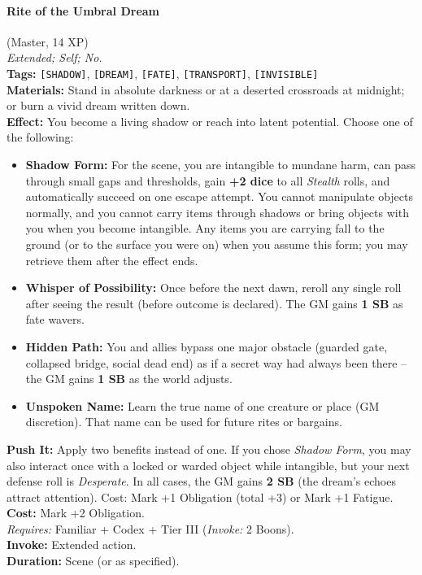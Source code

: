 \paragraph{Rite of the Umbral Dream} (Master, 14 XP) \hfill \\
\emph{Extended; Self; No.} \\
\textbf{Tags:} \texttt{[SHADOW]}, \texttt{[DREAM]}, \texttt{[FATE]}, \texttt{[TRANSPORT]}, \texttt{[INVISIBLE]} \\
\textbf{Materials:} Stand in absolute darkness or at a deserted crossroads at midnight; or burn a vivid dream written down. \\
\textbf{Effect:} You become a living shadow or reach into latent potential. Choose one of the following:
\begin{itemize}
  \item \textbf{Shadow Form:} For the scene, you are intangible to mundane harm, can pass through small gaps and thresholds, gain \textbf{+2 dice} to all \textit{Stealth} rolls, and automatically succeed on one escape attempt. You cannot manipulate objects normally, and you cannot carry items through shadows or bring objects with you when you become intangible. Any items you are carrying fall to the ground (or to the surface you were on) when you assume this form; you may retrieve them after the effect ends.
  \item \textbf{Whisper of Possibility:} Once before the next dawn, reroll any single roll after seeing the result (before outcome is declared). The GM gains \textbf{1 SB} as fate wavers.
  \item \textbf{Hidden Path:} You and allies bypass one major obstacle (guarded gate, collapsed bridge, social dead end) as if a secret way had always been there -- the GM gains \textbf{1 SB} as the world adjusts.
  \item \textbf{Unspoken Name:} Learn the true name of one creature or place (GM discretion). That name can be used for future rites or bargains.
\end{itemize}
\textbf{Push It:} Apply two benefits instead of one. If you chose \textit{Shadow Form}, you may also interact once with a locked or warded object while intangible, but your next defense roll is \textit{Desperate}. In all cases, the GM gains \textbf{2 SB} (the dream's echoes attract attention). Cost: Mark +1 Obligation (total +3) or Mark +1 Fatigue. \\
\textbf{Cost:} Mark +2 Obligation. \\
\textit{Requires:} Familiar + Codex + Tier III (\textit{Invoke:} 2 Boons). \\
\textbf{Invoke:} Extended action. \\
\textbf{Duration:} Scene (or as specified).

